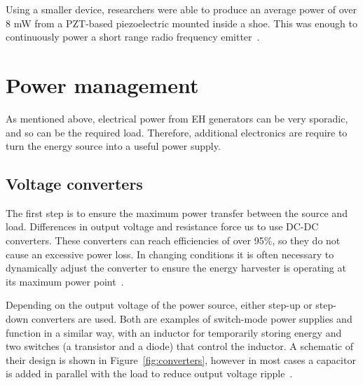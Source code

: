 \documentclass[a4paper,10pt]{article}
\begin{document}
Using a smaller device, researchers were able to produce an average power of over 8 mW from a \ac{PZT}-based piezoelectric mounted inside a shoe. This was enough to continuously power a short range radio frequency emitter~\cite{piezo-shoe-ieee}. 


\section{Power management}

As mentioned above, electrical power from \ac{EH} generators can be very sporadic, and so can be the required load. Therefore, additional electronics are require to turn the energy source into a useful power supply. 

\subsection{Voltage converters}

The first step is to ensure the maximum power transfer between the source and load. Differences in output voltage and resistance force us to use DC-DC converters. These converters can reach efficiencies of over 95\%, so they do not cause an excessive power loss. In changing conditions it is often necessary to dynamically adjust the converter to ensure the energy harvester is operating at its maximum power point~\cite{solar-mppt-ieee}. 

Depending on the output voltage of the power source, either step-up or step-down converters are used. Both are examples of switch-mode power supplies and function in a similar way, with an inductor for temporarily storing energy and two switches (a transistor and a diode) that control the inductor. A schematic of their design is shown in Figure~\ref{fig:converters}, however in most cases a capacitor is added in parallel with the load to reduce output voltage ripple~\cite{wiki:dcdc}. 
\end{document}
